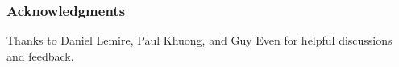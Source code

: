 \documentclass[runningheads]{llncs}
\begin{document}









\subsubsection*{Acknowledgments}
Thanks to Daniel Lemire, Paul Khuong, and Guy Even for helpful discussions and feedback.




\end{document}
